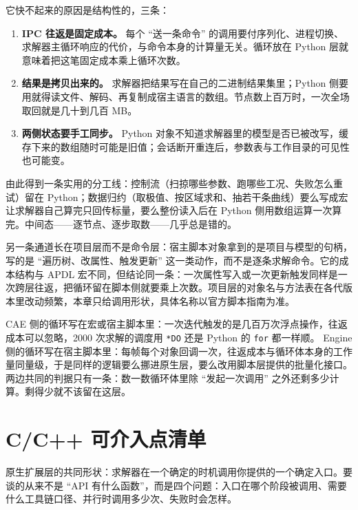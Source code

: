 \documentclass[12pt,a4paper,fontset=fandol]{ctexbook}
\newcommand{\Tp}[1]{\texttt{#1}}
\newcommand{\Lang}[1]{\textsf{#1}}
\newcommand{\PY}{\Lang{Python}}
\newcommand{\DomCAE}{\Lang{CAE}}
\newcommand{\DomEngine}{\Lang{Engine}}
\begin{document}
它快不起来的原因是结构性的，三条：

\begin{enumerate}
\item \textbf{IPC 往返是固定成本。} 每个 ``送一条命令'' 的调用要付序列化、进程切换、求解器主循环响应的代价，与命令本身的计算量无关。循环放在 Python 层就意味着把这笔固定成本乘上循环次数。
\item \textbf{结果是拷贝出来的。} 求解器把结果写在自己的二进制结果集里；Python 侧要用就得读文件、解码、再复制成宿主语言的数组。节点数上百万时，一次全场取回就是几十到几百 MB。
\item \textbf{两侧状态要手工同步。} Python 对象不知道求解器里的模型是否已被改写，缓存下来的数组随时可能是旧值；会话断开重连后，参数表与工作目录的可见性也可能变。
\end{enumerate}

由此得到一条实用的分工线：控制流（扫掠哪些参数、跑哪些工况、失败怎么重试）留在 Python；数据归约（取极值、按区域求和、抽若干条曲线）要么写成宏让求解器自己算完只回传标量，要么整份读入后在 \PY{} 侧用数组运算一次算完。中间态——逐节点、逐步取数——几乎总是错的。

另一条通道长在项目层而不是命令层：宿主脚本对象拿到的是项目与模型的句柄，写的是 ``遍历树、改属性、触发更新'' 这一类动作，而不是逐条求解命令。它的成本结构与 APDL 宏不同，但结论同一条：一次属性写入或一次更新触发同样是一次跨层往返，把循环留在脚本侧就要乘上次数。项目层的对象名与方法表在各代版本里改动频繁，本章只给调用形状，具体名称以官方脚本指南为准。

\begin{compare}[title={同样一个循环，放在两个域的脚本层里命运不同}]
\DomCAE{} 侧的循环写在宏或宿主脚本里：一次迭代触发的是几百万次浮点操作，往返成本可以忽略，2000 次求解的调度用 \Tp{*DO} 还是 \PY{} 的 \Tp{for} 都一样顺。
\DomEngine{} 侧的循环写在宿主脚本里：每帧每个对象回调一次，往返成本与循环体本身的工作量同量级，于是同样的逻辑要么挪进原生层，要么改用脚本层提供的批量化接口。
两边共同的判据只有一条：数一数循环体里除 ``发起一次调用'' 之外还剩多少计算。剩得少就不该留在这层。
\end{compare}

\section{C/C++ 可介入点清单}
\label{sec:ch02-cpp-hooks}

原生扩展层的共同形状：求解器在一个确定的时机调用你提供的一个确定入口。要谈的从来不是 ``API 有什么函数''，而是四个问题：入口在哪个阶段被调用、需要什么工具链口径、并行时调用多少次、失败时会怎样。
\end{document}
